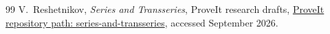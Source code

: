 \documentclass[11pt,a4paper]{article}
\theoremstyle{definition}
\begin{document}
\begin{thebibliography}{99}
V.~Reshetnikov,
\newblock \emph{Series and Transseries}, ProveIt research drafts,
\newblock \href{https://github.com/VladimirReshetnikov/ProveIt/tree/main/Analysis/FabiusFunction/docs/semi-formalized-research-frontiers/drafts/series-and-transseries}{ProveIt repository path: series-and-transseries}, accessed September 2026.

\end{thebibliography}
\end{document}
